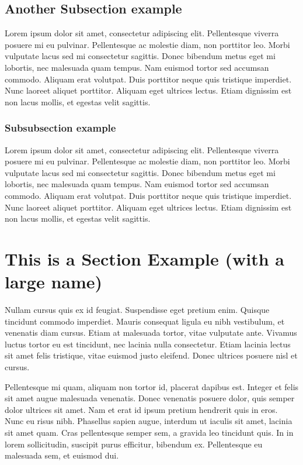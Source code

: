 \documentclass{arcanum}
\begin{document}
\subsection{Another Subsection example}
Lorem ipsum dolor sit amet, consectetur adipiscing elit. Pellentesque viverra
posuere mi eu pulvinar. Pellentesque ac molestie diam, non porttitor leo. Morbi
vulputate lacus sed mi consectetur sagittis. Donec bibendum metus eget mi lobortis,
nec malesuada quam tempus. Nam euismod tortor sed accumsan commodo. Aliquam erat
volutpat. Duis porttitor neque quis tristique imperdiet. Nunc laoreet aliquet
porttitor. Aliquam eget ultrices lectus. Etiam dignissim est non lacus mollis,
et egestas velit sagittis.

\subsubsection{Subsubsection example}
Lorem ipsum dolor sit amet, consectetur adipiscing elit. Pellentesque viverra
posuere mi eu pulvinar. Pellentesque ac molestie diam, non porttitor leo. Morbi
vulputate lacus sed mi consectetur sagittis. Donec bibendum metus eget mi lobortis,
nec malesuada quam tempus. Nam euismod tortor sed accumsan commodo. Aliquam erat
volutpat. Duis porttitor neque quis tristique imperdiet. Nunc laoreet aliquet
porttitor. Aliquam eget ultrices lectus. Etiam dignissim est non lacus mollis,
et egestas velit sagittis.

\section{This is a Section Example (with a large name)}
Nullam cursus quis ex id feugiat. Suspendisse eget pretium enim. Quisque
tincidunt commodo imperdiet. Mauris consequat ligula eu nibh vestibulum,
et venenatis diam cursus. Etiam at malesuada tortor, vitae vulputate ante.
Vivamus luctus tortor eu est tincidunt, nec lacinia nulla consectetur. Etiam
lacinia lectus sit amet felis tristique, vitae euismod justo eleifend. Donec
ultrices posuere nisl et cursus.

Pellentesque mi quam, aliquam non tortor id, placerat dapibus est. Integer et
felis sit amet augue malesuada venenatis. Donec venenatis posuere dolor, quis
semper dolor ultrices sit amet. Nam et erat id ipsum pretium hendrerit quis in
eros. Nunc eu risus nibh. Phasellus sapien augue, interdum ut iaculis sit amet,
lacinia sit amet quam. Cras pellentesque semper sem, a gravida leo tincidunt
quis. In in lorem sollicitudin, suscipit purus efficitur, bibendum ex.
Pellentesque eu malesuada sem, et euismod dui.
\end{document}

